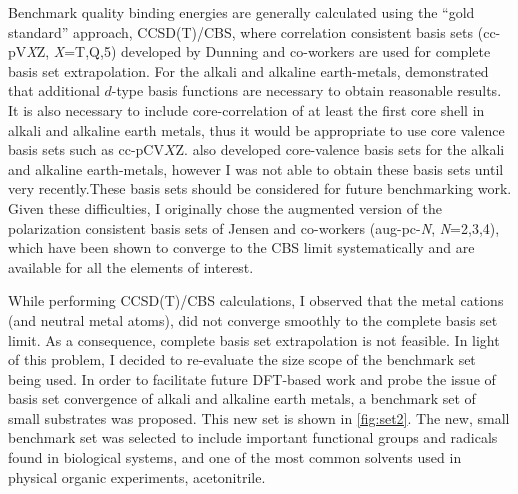 \begin{doublespace}
Benchmark quality binding energies are generally calculated using the ``gold
standard'' approach, CCSD(T)/CBS, where correlation consistent basis
sets\cite{Marshall2011, Rezac2013} (cc-pV\emph{X}Z, \emph{X}=T,Q,5) developed by
Dunning and\cite{Vydrov2006, Vydrov2006a} co-workers are used for complete basis
set extrapolation. For the alkali and alkaline earth-metals, \citet{Iron2003}
demonstrated that additional $d$-type basis functions are necessary to obtain
reasonable results. It is also necessary to include core-correlation of at least
the first core shell in alkali and alkaline earth metals, thus it would be
appropriate to use core valence basis sets such as
cc-pCV$X$Z.\cite{Peterson2002} \citet{Iron2003} also developed core-valence
basis sets for the alkali and alkaline earth-metals, however I was not able to
obtain these basis sets until very recently.\footnotemark These basis sets
should be considered for future benchmarking work. Given these difficulties, I
originally chose the augmented version of the polarization consistent basis sets
of Jensen and co-workers\cite{Jensen2001, Jensen2002, Jensen2002a, Jensen2003}
(aug-pc-\emph{N}, \emph{N}=2,3,4), which have been shown to converge to the CBS
limit systematically\cite{Kupka2007} and are available for all the elements of
interest.


While performing CCSD(T)/CBS calculations, I observed that the metal cations
(and neutral metal atoms), did not converge smoothly to the complete basis set
limit. As a consequence, complete basis set extrapolation is not feasible. In
light of this problem, I decided to re-evaluate the size scope of the benchmark
set being used. In order to facilitate future DFT-based work and probe the issue
of basis set convergence of alkali and alkaline earth metals, a benchmark set of
small substrates was proposed. This new set is shown in \ref{fig:set2}. The new,
small benchmark set was selected to include important functional groups and
radicals found in biological systems, and one of the most common solvents used
in physical organic experiments, acetonitrile.


\end{doublespace}
